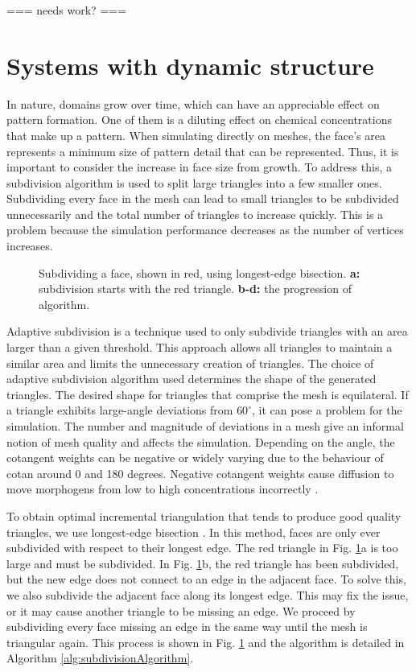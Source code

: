 === needs work? ===

\section{Systems with dynamic structure}
In nature, domains grow over time, which can have an appreciable effect on pattern formation. One of them is a diluting effect on chemical concentrations that make up a pattern. When simulating directly on meshes, the face's area represents a minimum size of pattern detail that can be represented. Thus, it is important to consider the increase in face size from growth. To address this, a subdivision algorithm is used to split large triangles into a few smaller ones. Subdividing every face in the mesh can lead to small triangles to be subdivided unnecessarily and the total number of triangles to increase quickly. This is a problem because the simulation performance decreases as the number of vertices increases. 

\begin{figure}[H]
	\centering
	\caption{Subdividing a face, shown in red, using longest-edge bisection. \textbf{a:} subdivision starts with the red triangle. \textbf{b-d:} the progression of algorithm.} 
	\label{fig:recursiveSubdiv}
\end{figure}

Adaptive subdivision is a technique used to only subdivide triangles with an area larger than a given threshold. This approach allows all triangles to maintain a similar area and limits the unnecessary creation of triangles. The choice of adaptive subdivision algorithm used determines the shape of the generated triangles. The desired shape for triangles that comprise the mesh is equilateral. If a triangle exhibits large-angle deviations from $60^{\circ}$, it can pose a problem for the simulation. The number and magnitude of deviations in a mesh give an informal notion of mesh quality and affects the simulation. Depending on the angle, the cotangent weights can be negative or widely varying due to the behaviour of cotan around 0 and 180 degrees. Negative cotangent weights cause diffusion to move morphogens from low to high concentrations incorrectly \citep{wardetzky2007}. 

To obtain optimal incremental triangulation that tends to produce good quality triangles, we use longest-edge bisection \citep{rivara1998}. In this method, faces are only ever subdivided with respect to their longest edge. The red triangle in Fig. \ref{fig:recursiveSubdiv}a is too large and must be subdivided. In Fig. \ref{fig:recursiveSubdiv}b, the red triangle has been subdivided, but the new edge does not connect to an edge in the adjacent face. To solve this, we also subdivide the adjacent face along its longest edge. This may fix the issue, or it may cause another triangle to be missing an edge. We proceed by subdividing every face missing an edge in the same way until the mesh is triangular again. This process is shown in Fig. \ref{fig:recursiveSubdiv} and the algorithm is detailed in Algorithm \ref{alg:subdivisionAlgorithm}. 

